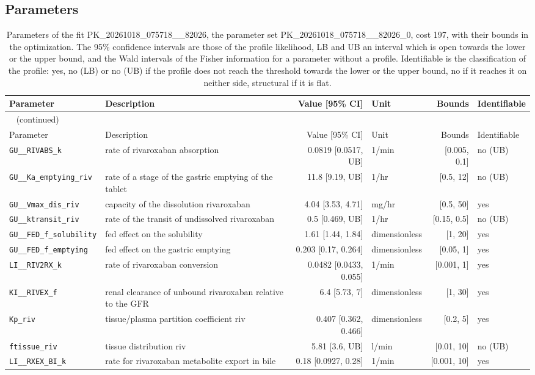 \subsection{Parameters}

\begin{longtable}{llrlrl}
\caption{Parameters of the fit PK\_20261018\_075718\_\_82026, the parameter set PK\_20261018\_075718\_\_82026\_0, cost 197, with their bounds in the optimization. The 95\% confidence intervals are those of the profile likelihood, LB and UB an interval which is open towards the lower or the upper bound, and the Wald intervals of the Fisher information for a parameter without a profile. Identifiable is the classification of the profile: yes, no (LB) or no (UB) if the profile does not reach the threshold towards the lower or the upper bound, no if it reaches it on neither side, structural if it is flat.}\label{tab:parameters:PK_20261018_075718__82026} \\
\toprule
Parameter & Description & Value [95\% CI] & Unit & Bounds & Identifiable \\
\midrule
\endfirsthead
\multicolumn{6}{l}{\small\tablename~\thetable{} (continued)} \\
\toprule
Parameter & Description & Value [95\% CI] & Unit & Bounds & Identifiable \\
\midrule
\endhead
\bottomrule
\endlastfoot
\texttt{GU\_\_RIVABS\_k} & rate of rivaroxaban absorption & 0.0819 [0.0517, UB] & 1/min & [0.005, 0.1] & no (UB) \\
\texttt{GU\_\_Ka\_emptying\_riv} & rate of a stage of the gastric emptying of the tablet & 11.8 [9.19, UB] & 1/hr & [0.5, 12] & no (UB) \\
\texttt{GU\_\_Vmax\_dis\_riv} & capacity of the dissolution rivaroxaban & 4.04 [3.53, 4.71] & mg/hr & [0.5, 50] & yes \\
\texttt{GU\_\_ktransit\_riv} & rate of the transit of undissolved rivaroxaban & 0.5 [0.469, UB] & 1/hr & [0.15, 0.5] & no (UB) \\
\texttt{GU\_\_FED\_f\_solubility} & fed effect on the solubility & 1.61 [1.44, 1.84] & dimensionless & [1, 20] & yes \\
\texttt{GU\_\_FED\_f\_emptying} & fed effect on the gastric emptying & 0.203 [0.17, 0.264] & dimensionless & [0.05, 1] & yes \\
\texttt{LI\_\_RIV2RX\_k} & rate of rivaroxaban conversion & 0.0482 [0.0433, 0.055] & 1/min & [0.001, 1] & yes \\
\texttt{KI\_\_RIVEX\_f} & renal clearance of unbound rivaroxaban relative to the GFR & 6.4 [5.73, 7] & dimensionless & [1, 30] & yes \\
\texttt{Kp\_riv} & tissue/plasma partition coefficient riv & 0.407 [0.362, 0.466] & dimensionless & [0.2, 5] & yes \\
\texttt{ftissue\_riv} & tissue distribution riv & 5.81 [3.6, UB] & l/min & [0.01, 10] & no (UB) \\
\texttt{LI\_\_RXEX\_BI\_k} & rate for rivaroxaban metabolite export in bile & 0.18 [0.0927, 0.28] & 1/min & [0.001, 10] & yes \\
\end{longtable}

